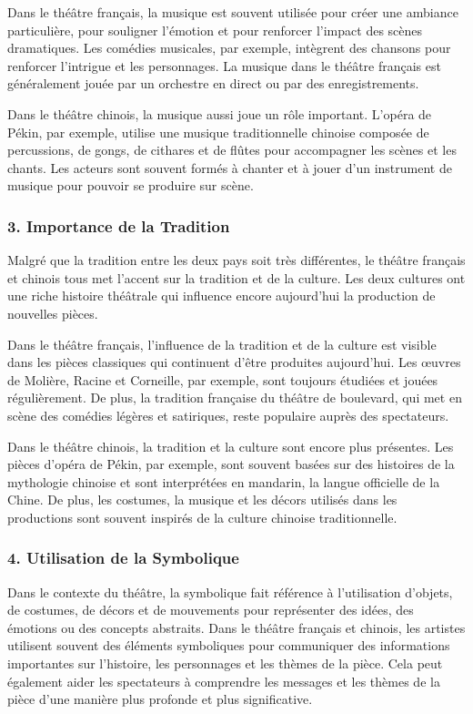 \documentclass[UTF8,a4paper,12pt]{ctexart}
\numberwithin{equation}{section}
\newcommand{\mycite}[1]{\cite{#1}}
\begin{document}
Dans le théâtre français, la musique est souvent utilisée pour créer une ambiance particulière, pour souligner l'émotion et pour renforcer l'impact des scènes dramatiques. Les comédies musicales, par exemple, intègrent des chansons pour renforcer l'intrigue et les personnages. La musique dans le théâtre français est généralement jouée par un orchestre en direct ou par des enregistrements\mycite{12}.

Dans le théâtre chinois, la musique aussi joue un rôle important. L'opéra de Pékin, par exemple, utilise une musique traditionnelle chinoise composée de percussions, de gongs, de cithares et de flûtes pour accompagner les scènes et les chants. Les acteurs sont souvent formés à chanter et à jouer d'un instrument de musique pour pouvoir se produire sur scène.

\subsubsection*{3. Importance de la Tradition}
Malgré que la tradition entre les deux pays soit très différentes, le théâtre français et chinois tous met l'accent sur la tradition et de la culture. Les deux cultures ont une riche histoire théâtrale qui influence encore aujourd'hui la production de nouvelles pièces.

Dans le théâtre français, l'influence de la tradition et de la culture est visible dans les pièces classiques qui continuent d'être produites aujourd'hui. Les œuvres de Molière, Racine et Corneille, par exemple, sont toujours étudiées et jouées régulièrement. De plus, la tradition française du théâtre de boulevard, qui met en scène des comédies légères et satiriques, reste populaire auprès des spectateurs.

Dans le théâtre chinois, la tradition et la culture sont encore plus présentes. Les pièces d'opéra de Pékin, par exemple, sont souvent basées sur des histoires de la mythologie chinoise et sont interprétées en mandarin, la langue officielle de la Chine. De plus, les costumes, la musique et les décors utilisés dans les productions sont souvent inspirés de la culture chinoise traditionnelle.

\subsubsection*{4. Utilisation de la Symbolique}
Dans le contexte du théâtre, la symbolique fait référence à l'utilisation d'objets, de costumes, de décors et de mouvements pour représenter des idées, des émotions ou des concepts abstraits. Dans le théâtre français et chinois, les artistes utilisent souvent des éléments symboliques pour communiquer des informations importantes sur l'histoire, les personnages et les thèmes de la pièce. Cela peut également aider les spectateurs à comprendre les messages et les thèmes de la pièce d'une manière plus profonde et plus significative\mycite{10}.
\end{document}
